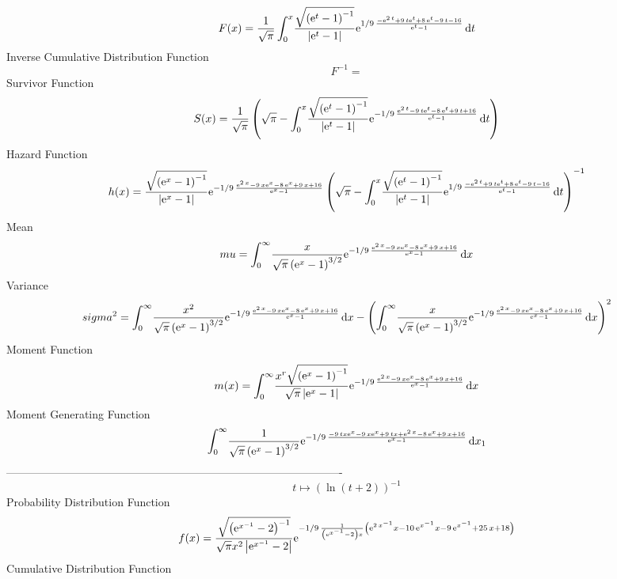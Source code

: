 \documentclass[12pt]{article}
\begin{document}
 $$F(x)={\frac {1}{\sqrt {\pi}}\int_{0}^{x}\!{\frac {\sqrt { \left( {{\rm e}^{
t}}-1 \right) ^{-1}}}{ \left| {{\rm e}^{t}}-1 \right| }{{\rm e}^{1/9\,
{\frac {-{{\rm e}^{2\,t}}+9\,t{{\rm e}^{t}}+8\,{{\rm e}^{t}}-9\,t-16}{
{{\rm e}^{t}}-1}}}}}\,{\rm d}t}
$$ Inverse Cumulative Distribution Function 
  $$F^{-1} = $$Survivor Function 
 $$ S(x)={\frac {1}{\sqrt {\pi}} \left( \sqrt {\pi}-\int_{0}^{x}\!{\frac {
\sqrt { \left( {{\rm e}^{t}}-1 \right) ^{-1}}}{ \left| {{\rm e}^{t}}-1
 \right| }{{\rm e}^{-1/9\,{\frac {{{\rm e}^{2\,t}}-9\,t{{\rm e}^{t}}-8
\,{{\rm e}^{t}}+9\,t+16}{{{\rm e}^{t}}-1}}}}}\,{\rm d}t \right) }
$$ Hazard Function 
 $$ h(x)={\frac {\sqrt { \left( {{\rm e}^{x}}-1 \right) ^{-1}}}{ \left| {
{\rm e}^{x}}-1 \right| }{{\rm e}^{-1/9\,{\frac {{{\rm e}^{2\,x}}-9\,x{
{\rm e}^{x}}-8\,{{\rm e}^{x}}+9\,x+16}{{{\rm e}^{x}}-1}}}} \left( 
\sqrt {\pi}-\int_{0}^{x}\!{\frac {\sqrt { \left( {{\rm e}^{t}}-1
 \right) ^{-1}}}{ \left| {{\rm e}^{t}}-1 \right| }{{\rm e}^{1/9\,{
\frac {-{{\rm e}^{2\,t}}+9\,t{{\rm e}^{t}}+8\,{{\rm e}^{t}}-9\,t-16}{{
{\rm e}^{t}}-1}}}}}\,{\rm d}t \right) ^{-1}}
$$Mean 
 $$ mu=\int_{0}^{\infty }\!{\frac {x}{\sqrt {\pi} \left( {{\rm e}^{x}}-1
 \right) ^{3/2}}{{\rm e}^{-1/9\,{\frac {{{\rm e}^{2\,x}}-9\,x{{\rm e}^
{x}}-8\,{{\rm e}^{x}}+9\,x+16}{{{\rm e}^{x}}-1}}}}}\,{\rm d}x
$$ Variance 
 $$ sigma^2 = \int_{0}^{\infty }\!{\frac {{x}^{2}}{\sqrt {\pi} \left( {{\rm e}^{x}}-
1 \right) ^{3/2}}{{\rm e}^{-1/9\,{\frac {{{\rm e}^{2\,x}}-9\,x{{\rm e}
^{x}}-8\,{{\rm e}^{x}}+9\,x+16}{{{\rm e}^{x}}-1}}}}}\,{\rm d}x-
 \left( \int_{0}^{\infty }\!{\frac {x}{\sqrt {\pi} \left( {{\rm e}^{x}
}-1 \right) ^{3/2}}{{\rm e}^{-1/9\,{\frac {{{\rm e}^{2\,x}}-9\,x{
{\rm e}^{x}}-8\,{{\rm e}^{x}}+9\,x+16}{{{\rm e}^{x}}-1}}}}}\,{\rm d}x
 \right) ^{2}
$$Moment Function 
 $$ m(x) = \int_{0}^{\infty }\!{\frac {{x}^{r}\sqrt { \left( {{\rm e}^{x}}-1
 \right) ^{-1}}}{\sqrt {\pi} \left| {{\rm e}^{x}}-1 \right| }{{\rm e}^
{-1/9\,{\frac {{{\rm e}^{2\,x}}-9\,x{{\rm e}^{x}}-8\,{{\rm e}^{x}}+9\,
x+16}{{{\rm e}^{x}}-1}}}}}\,{\rm d}x
$$ Moment Generating Function 
 $$\int_{0}^{\infty }\!{\frac {1}{\sqrt {\pi} \left( {{\rm e}^{x}}-1
 \right) ^{3/2}}{{\rm e}^{-1/9\,{\frac {-9\,tx{{\rm e}^{x}}-9\,x{
{\rm e}^{x}}+9\,tx+{{\rm e}^{2\,x}}-8\,{{\rm e}^{x}}+9\,x+16}{{{\rm e}
^{x}}-1}}}}}\,{\rm d}x_{{1}}
$$-------------------------------------------------------------------------------------------  \\$$t\mapsto  \left( \ln  \left( t+2 \right)  \right) ^{-1}
$$Probability Distribution Function 
$$  f(x)={\frac {\sqrt { \left( {{\rm e}^{{x}^{-1}}}-2 \right) ^{-1}}}{\sqrt {
\pi}{x}^{2} \left| {{\rm e}^{{x}^{-1}}}-2 \right| }{{\rm e}^{-1/9\,{
\frac {1}{ \left( {{\rm e}^{{x}^{-1}}}-2 \right) x} \left( {{\rm e}^{2
\,{x}^{-1}}}x-10\,{{\rm e}^{{x}^{-1}}}x-9\,{{\rm e}^{{x}^{-1}}}+25\,x+
18 \right) }}}}
$$Cumulative Distribution Function  
\end{document}
